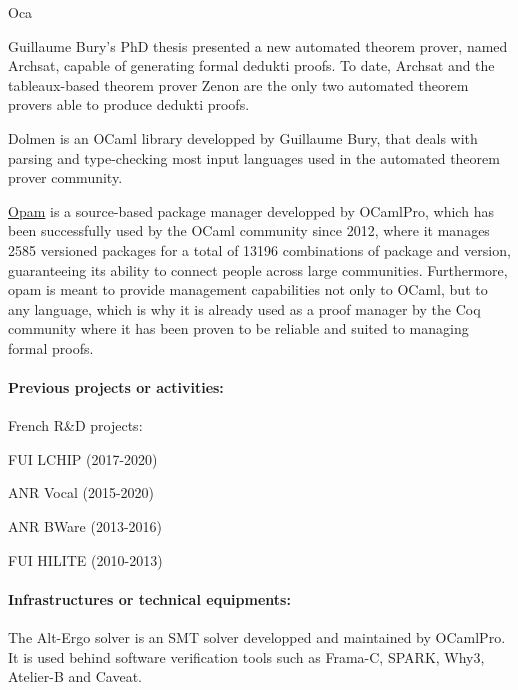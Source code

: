 \begin{sitedescription}{Oca}
\begin{compactitem}
\item Guillaume Bury's PhD thesis presented a new automated theorem
  prover, named Archsat, capable of generating formal dedukti proofs. To date,
  Archsat and the tableaux-based theorem prover Zenon are the only two automated
  theorem provers able to produce dedukti proofs.
\item Dolmen is an OCaml library developped by Guillaume Bury,
  that deals with parsing and type-checking most input languages used in
  the automated theorem prover community.
\item \href{https://opam.ocaml.org/}{Opam} is a source-based package manager developped by OCamlPro,
  which has been successfully used by the OCaml community since 2012, where
  it manages 2585 versioned packages for a total of 13196 combinations of package
  and version, guaranteeing its ability to connect people across large communities.
  Furthermore, opam is meant to provide management capabilities not only to
  OCaml, but to any language, which is why it is already used as a proof manager
  by the Coq community where it has been proven to be reliable and suited to
  managing formal proofs.
\end{compactitem}

\paragraph*{Previous projects or activities:}

French R\&D projects:
\begin{compactitem}
\item FUI LCHIP (2017-2020)
\item ANR Vocal (2015-2020)
\item ANR BWare (2013-2016)
\item FUI HILITE (2010-2013)
\end{compactitem}

\paragraph*{Infrastructures or technical equipments:}

\begin{compactitem}
\item The Alt-Ergo solver\cite{ae2.2} is an SMT solver developped and
  maintained by OCamlPro. It is used behind software verification tools
  such as Frama-C, SPARK, Why3, Atelier-B and Caveat.
\end{compactitem}


\end{sitedescription}
